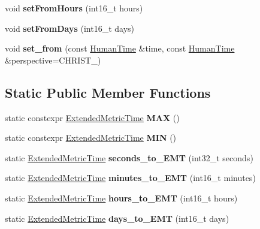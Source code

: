 \begin{DoxyCompactItemize}
void {\bfseries set\+From\+Hours} (int16\+\_\+t hours)
\item 
\mbox{\label{classtime_1_1_extended_metric_time_a11201a5647e242265927f0f3532fc2b3}} 
void {\bfseries set\+From\+Days} (int16\+\_\+t days)
\item 
\mbox{\label{classtime_1_1_extended_metric_time_ad495dc5cdc8ab37fa69a87fbe95acdab}} 
void {\bfseries set\+\_\+from} (const \mbox{\hyperlink{classtime_1_1_human_time}{Human\+Time}} \&time, const \mbox{\hyperlink{classtime_1_1_human_time}{Human\+Time}} \&perspective=C\+H\+R\+I\+S\+T\+\_)
\end{DoxyCompactItemize}
\subsection*{Static Public Member Functions}
\begin{DoxyCompactItemize}
\item 
\mbox{\label{classtime_1_1_extended_metric_time_a46860f68d4e75e04346a70e75caf69b1}} 
static constexpr \mbox{\hyperlink{classtime_1_1_extended_metric_time}{Extended\+Metric\+Time}} {\bfseries M\+AX} ()
\item 
\mbox{\label{classtime_1_1_extended_metric_time_a78564df9198545b2ddc22b41651e539d}} 
static constexpr \mbox{\hyperlink{classtime_1_1_extended_metric_time}{Extended\+Metric\+Time}} {\bfseries M\+IN} ()
\item 
\mbox{\label{classtime_1_1_extended_metric_time_ac89add241c4b1f68ab9eb4df9fc04d19}} 
static \mbox{\hyperlink{classtime_1_1_extended_metric_time}{Extended\+Metric\+Time}} {\bfseries seconds\+\_\+to\+\_\+\+E\+MT} (int32\+\_\+t seconds)
\item 
\mbox{\label{classtime_1_1_extended_metric_time_a2d465cc81c5b515c87e330db799ae433}} 
static \mbox{\hyperlink{classtime_1_1_extended_metric_time}{Extended\+Metric\+Time}} {\bfseries minutes\+\_\+to\+\_\+\+E\+MT} (int16\+\_\+t minutes)
\item 
\mbox{\label{classtime_1_1_extended_metric_time_a93552ee1c70f47062e5dc8b1ffe980e9}} 
static \mbox{\hyperlink{classtime_1_1_extended_metric_time}{Extended\+Metric\+Time}} {\bfseries hours\+\_\+to\+\_\+\+E\+MT} (int16\+\_\+t hours)
\item 
\mbox{\label{classtime_1_1_extended_metric_time_a970c520285f579836cc1130203e2e5b9}} 
static \mbox{\hyperlink{classtime_1_1_extended_metric_time}{Extended\+Metric\+Time}} {\bfseries days\+\_\+to\+\_\+\+E\+MT} (int16\+\_\+t days)
\end{DoxyCompactItemize}
